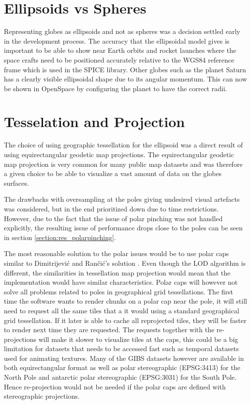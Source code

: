 \section{Ellipsoids vs Spheres}
Representing globes as ellipsoids and not as spheres was a decision settled early in the development process. 
The accuracy that the ellipsoidal model gives is important to be able to show near Earth orbits and rocket launches where the space crafts need to be positioned accurately relative to the WGS84 reference frame which is used in the SPICE library. 
Other globes such as the planet Saturn has a clearly visible ellipsoidal shape due to its angular momentum. This can now be shown in OpenSpace by configuring the planet to have the correct radii.

\section{Tesselation and Projection}
The choice of using geographic tessellation for the ellipsoid was a direct result of using equirectangular geodetic map projections. 
The equirectangular geodetic map projection is very common for many public map datasets and was therefore a given choice to be able to visualize a vast amount of data on the globes surfaces.

The drawbacks with oversampling at the poles giving undesired visual artefacts was considered, but in the end prioritized down due to time restrictions. However, due to the fact that the issue of polar pinching was not handled explicitly, the resulting issue of performance drops close to the poles can be seen in section \ref{section:res_polarpinching}.

The most reasonable solution to the polar issues would be to use polar caps similar to Dimitrijevi\'{c} and Ran\v{c}i\'{c}'s solution \cite{dimi15}. Even though the LOD algorithm is different, the similarities in tessellation map projection would mean that the implementation would have similar characteristics. Polar caps will however not solve all problems related to poles in geographical grid tessellations. The first time the software wants to render chunks on a polar cap near the pole, it will still need to request all the same tiles that a it would using a standard geographical grid tessellation. If it later is able to cache all reprojected tiles, they will be faster to render next time they are requested. The requests together with the re-projections will make it slower to visualize tiles at the caps, this could be a big limitation for datasets that needs to be accessed fast such as temporal datasets used for animating textures. Many of the GIBS datasets however are available in both equirectangular format as well as polar stereographic (EPSG:3413) for the North Pole and antarctic polar stereographic (EPSG:3031) for the South Pole. Hence re-projection would not be needed if the polar caps are defined with stereographic projections. 

